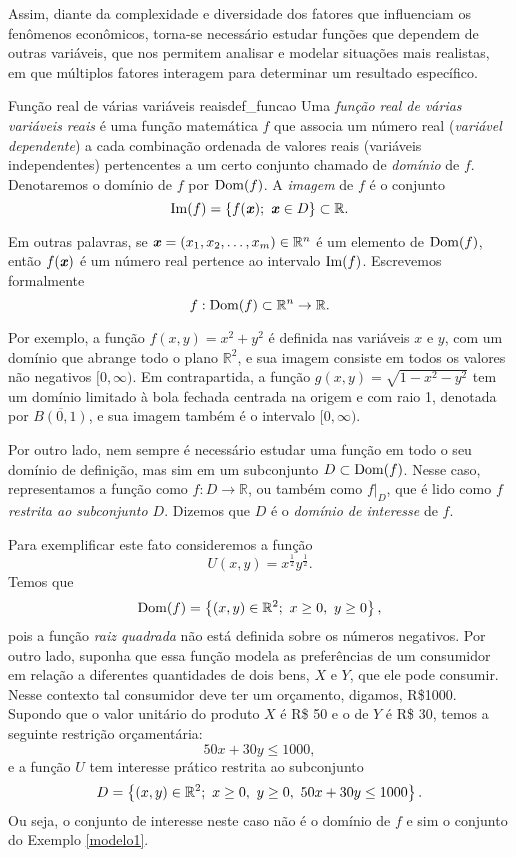 Assim, diante da complexidade e diversidade dos fatores que influenciam os fenômenos econômicos, torna-se necessário estudar funções que dependem de outras variáveis, que nos permitem analisar e modelar situações mais realistas, em que múltiplos fatores interagem para determinar um resultado específico. 



\begin{definition}{Função real de várias variáveis reais}{def_funcao}
Uma \textit{função real de várias variáveis reais} é uma função matemática \( f \) que associa um número real (\textit{variável dependente}) a cada combinação ordenada de valores reais (variáveis independentes) pertencentes a um certo conjunto chamado de \textit{domínio} de $f$. 
Denotaremos o domínio de $f$ por $\operatorname{Dom}(f)$. A \textit{imagem} de $f$ é o conjunto 
$$\Img(f)%
=\left\{f(\Point{x});~\Point{x}\in D\right\}\subset\R.$$
\end{definition}
Em outras palavras, se \( \textbf{\textit{x}} = (x_1, x_2, \ldots, x_m)\in\mathbb{R}^n \) é um elemento de \( \operatorname{Dom}(f) \), então \( f(\textbf{\textit{x}}) \) é um número real pertence ao intervalo $\operatorname{Im}(f)$. Escrevemos formalmente
\[ f: \operatorname{Dom}(f) \subset \mathbb{R}^n \rightarrow \mathbb{R}. \]

Por exemplo, a função \(f(x,y) = x^2 + y^2\) é definida nas variáveis \(x\) e \(y\), com um domínio que abrange todo o plano \(\mathbb{R}^2\), e sua imagem consiste em todos os valores não negativos \([0, \infty)\). Em contrapartida, a função \(g(x,y) = \sqrt{1-x^2-y^2}\) tem um domínio limitado à bola fechada centrada na origem e com raio 1, denotada por \(\overline{B(0,1)}\), e sua imagem também é o intervalo \([0, \infty)\).

Por outro lado, nem sempre é necessário estudar uma função em todo o seu domínio de definição, mas sim em um subconjunto \(D \subset \operatorname{Dom}(f)\). Nesse caso, representamos a função como \(f: D \to \mathbb{R}\), ou também como \(f|_D\), que é lido como \textit{$f$ restrita ao subconjunto $D$}. Dizemos que $D$ é o \textit{domínio de interesse} de $f$. 

Para exemplificar este fato consideremos a função
$$U(x,y)=x^{\frac{1}{2}}y^{\frac{1}{2}}.$$
Temos que 
$$\operatorname{Dom}(f)=\left\{(x,y)\in\mathbb{R}^2; ~ x\geq 0,~y\geq 0\right\},$$
pois a função \textit{raiz quadrada} não está definida sobre os números negativos. Por outro lado, suponha que essa função modela as preferências de um consumidor em relação a diferentes quantidades de dois bens, $X$ e $Y$, que ele pode consumir. Nesse contexto tal consumidor deve ter um orçamento, digamos, R\$1000. Supondo que o valor unitário do produto $X$ é R\$ 50 e o de $Y$ é R\$ 30, temos a seguinte restrição orçamentária: 
$$50x+30y\leq 1000,$$
e a função $U$ tem interesse prático restrita ao subconjunto
$$D=\left\{(x,y)\in \mathbb{R}^2;~x\geq 0,~y\geq0,~50x+30y\leq 1000 \right\}.$$
Ou seja, o conjunto de interesse neste caso não é o domínio de $f$ e sim o conjunto do Exemplo \ref{modelo1}. 



